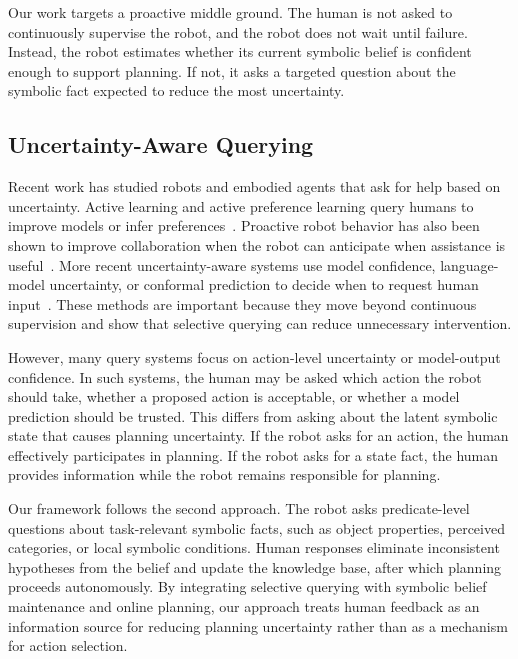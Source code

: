 Our work targets a proactive middle ground. The human is not asked to continuously supervise the robot, and the robot does not wait until failure. Instead, the robot estimates whether its current symbolic belief is confident enough to support planning. If not, it asks a targeted question about the symbolic fact expected to reduce the most uncertainty.

\subsection{Uncertainty-Aware Querying}
\label{sec:related_query}

Recent work has studied robots and embodied agents that ask for help based on uncertainty. Active learning and active preference learning query humans to improve models or infer preferences~\cite{sadigh2017active}. Proactive robot behavior has also been shown to improve collaboration when the robot can anticipate when assistance is useful~\cite{baraglia2017efficient}. More recent uncertainty-aware systems use model confidence, language-model uncertainty, or conformal prediction to decide when to request human input~\cite{knowno2023,liang2024introspective,mullen2025lbap}. These methods are important because they move beyond continuous supervision and show that selective querying can reduce unnecessary intervention.

However, many query systems focus on action-level uncertainty or model-output confidence. In such systems, the human may be asked which action the robot should take, whether a proposed action is acceptable, or whether a model prediction should be trusted. This differs from asking about the latent symbolic state that causes planning uncertainty. If the robot asks for an action, the human effectively participates in planning. If the robot asks for a state fact, the human provides information while the robot remains responsible for planning.

Our framework follows the second approach. The robot asks predicate-level questions about task-relevant symbolic facts, such as object properties, perceived categories, or local symbolic conditions. Human responses eliminate inconsistent hypotheses from the belief and update the knowledge base, after which planning proceeds autonomously. By integrating selective querying with symbolic belief maintenance and online planning, our approach treats human feedback as an information source for reducing planning uncertainty rather than as a mechanism for action selection.
